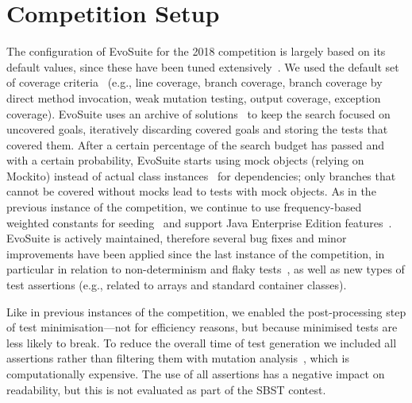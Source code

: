 \documentclass[sigconf,table]{acmart}
\newcommand{\TODO}[1]{\textbf{\textcolor{ScarletRed}{[TODO: #1]}}\xspace}
\newcommand{\TODO}[1]{}
\newcommand{\EVOSUITE}{{\sc EvoSuite}\xspace}
\begin{document}


\section{Competition Setup}

The configuration of \EVOSUITE for the 2018 competition is largely
based on its default values, since these have been tuned
extensively~\cite{arcuri2013parameter}. We used the default set of
coverage criteria~\cite{rojas2015combining} (e.g., line coverage,
branch coverage, branch coverage by direct method invocation, weak
mutation testing, output coverage, exception coverage). \EVOSUITE uses
an archive of solutions~\cite{emse_archive} to keep the search focused
on uncovered goals, iteratively discarding covered goals and storing
the tests that covered them. After a certain percentage of the search
budget has passed and with a certain probability, \EVOSUITE starts
using mock objects (relying on Mockito) instead of actual class
instances~\cite{ICST_Mocking17} for dependencies; only branches that
cannot be covered without mocks lead to tests with mock objects. As in
the previous instance of the competition, we continue to use
frequency-based weighted constants for
seeding~\cite{sakti2015instance} and support Java Enterprise Edition
features~\cite{arcuri2016java}. %
\EVOSUITE is actively maintained, therefore several bug fixes and
minor improvements have been applied since the last instance of the
competition, in particular in relation to non-determinism and flaky
tests~\cite{arcuri2014automated}, as well as new types of test
assertions (e.g., related to arrays and standard container classes).

Like in previous instances of the competition, we enabled the
post-processing step of test minimisation---not for efficiency
reasons, but because minimised tests are less likely to break. To
reduce the overall time of test generation we included all assertions
rather than filtering them with mutation
analysis~\cite{10.1109/TSE.2011.93}, which is computationally
expensive. The use of all assertions has a negative impact on
readability, but this is not evaluated as part of the SBST contest.
\end{document}
